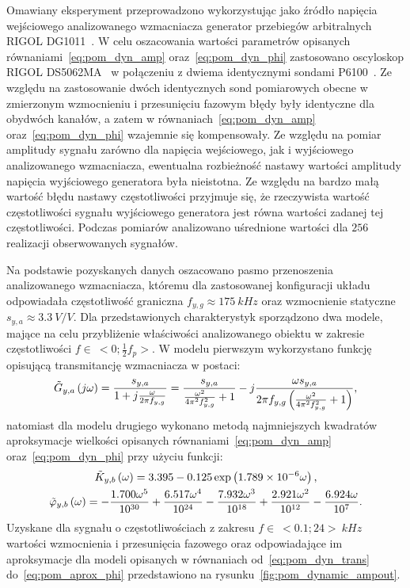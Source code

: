 Omawiany eksperyment przeprowadzono wykorzystując jako źródło napięcia wejściowego analizowanego wzmacniacza generator przebiegów arbitralnych RIGOL DG1011~\cite{rigol_fawg}. W celu oszacowania wartości parametrów opisanych równaniami~\eqref{eq:pom_dyn_amp} oraz~\eqref{eq:pom_dyn_phi} zastosowano oscyloskop RIGOL DS5062MA~\cite{rigol_dso} w połączeniu z dwiema identycznymi sondami P6100~\cite{wellzion_probes}. Ze względu na zastosowanie dwóch identycznych sond pomiarowych obecne w zmierzonym wzmocnieniu i przesunięciu fazowym błędy były identyczne dla obydwóch kanałów, a zatem w równaniach~\eqref{eq:pom_dyn_amp} oraz~\eqref{eq:pom_dyn_phi} wzajemnie się kompensowały. Ze względu na pomiar amplitudy sygnału zarówno dla napięcia wejściowego, jak i wyjściowego analizowanego wzmacniacza, ewentualna rozbieżność nastawy wartości amplitudy napięcia wyjściowego generatora była nieistotna. Ze względu na bardzo małą wartość błędu nastawy częstotliwości przyjmuje się, że rzeczywista wartość częstotliwości sygnału wyjściowego generatora jest równa wartości zadanej tej częstotliwości. Podczas pomiarów analizowano uśrednione wartości dla $256$ realizacji obserwowanych sygnałów.

Na podstawie pozyskanych danych oszacowano pasmo przenoszenia analizowanego wzmacniacza, któremu dla zastosowanej konfiguracji układu odpowiadała częstotliwość graniczna $f_{y,g} \approx \qty{175}{kHz}$ oraz wzmocnienie statyczne $s_{y,a} \approx \qty{3.3}{V \per V}$. Dla przedstawionych charakterystyk sporządzono dwa modele, mające na celu przybliżenie właściwości analizowanego obiektu w zakresie częstotliwości $f \in~<0;\frac{1}{2}f_{p}>$. W modelu pierwszym wykorzystano funkcję opisującą transmitancję wzmacniacza w postaci:
\begin{gather}
\tilde{G}_{y,a} \left(j\omega\right) = \frac{s_{y,a}}{1 + j \frac{\omega}{2 \pi f_{y,g}}} = \frac{s_{y,a}}{\frac{\omega^{2}}{4 \pi^{2} f_{y,g}^{2}} + 1} - j \frac{\omega s_{y,a}}{2 \pi f_{y,g} \left( \frac{\omega^{2}}{4 \pi^{2} f_{y,g}^{2}} + 1 \right) } \label{eq:pom_dyn_trans},
\end{gather}
natomiast dla modelu drugiego wykonano metodą najmniejszych kwadratów aproksymacje wielkości opisanych równaniami~\eqref{eq:pom_dyn_amp} oraz~\eqref{eq:pom_dyn_phi} przy użyciu funkcji:
\begin{gather}
\tilde{K}_{y,b} \left(\omega\right) = 3.395 - 0.125 \exp \left(\num{1.789e-6} \omega\right) \label{eq:pom_aprox_amp}, \\
\tilde{\varphi}_{y,b} \left(\omega\right) = -\frac{1.700 \omega^{5}}{\num{e30}} + \frac{6.517 \omega^{4}}{\num{e24}} - \frac{7.932 \omega^{3}}{\num{e18}} + \frac{2.921 \omega^{2}}{\num{e12}} - \frac{6.924 \omega}{\num{e07}} \label{eq:pom_aprox_phi}.
\end{gather}
Uzyskane dla sygnału o częstotliwościach z zakresu $f \in~<0.1; 24>~\unit{kHz}$ wartości wzmocnienia i przesunięcia fazowego oraz odpowiadające im aproksymacje dla modeli opisanych w równaniach od~\eqref{eq:pom_dyn_trans} do~\eqref{eq:pom_aprox_phi} przedstawiono na rysunku~\ref{fig:pom_dynamic_ampout}.

